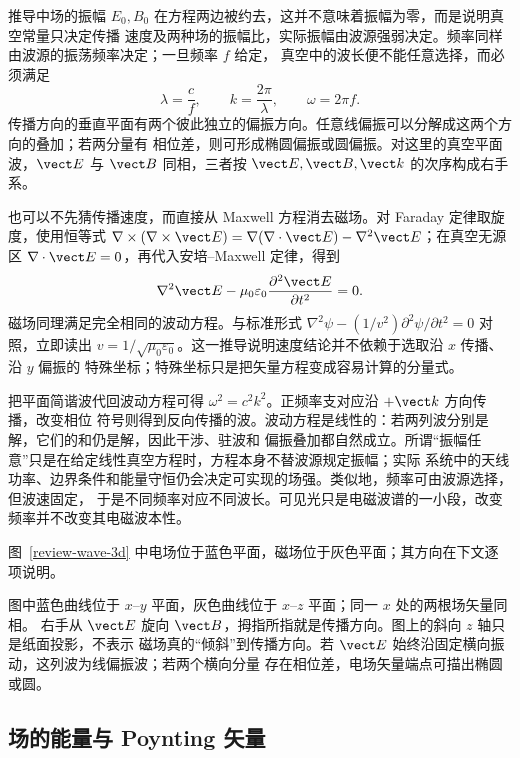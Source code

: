 推导中场的振幅 $E_0,B_0$ 在方程两边被约去，这并不意味着振幅为零，而是说明真空常量只决定传播
速度及两种场的振幅比，实际振幅由波源强弱决定。频率同样由波源的振荡频率决定；一旦频率 $f$ 给定，
真空中的波长便不能任意选择，而必须满足
\begin{equation}
  \lambda=\frac{c}{f},\qquad k=\frac{2\pi}{\lambda},\qquad \omega=2\pi f.
\end{equation}
传播方向的垂直平面有两个彼此独立的偏振方向。任意线偏振可以分解成这两个方向的叠加；若两分量有
相位差，则可形成椭圆偏振或圆偏振。对这里的真空平面波，$\vect E$ 与 $\vect B$ 同相，三者按
$\vect E,\vect B,\vect k$ 的次序构成右手系。

也可以不先猜传播速度，而直接从 Maxwell 方程消去磁场。对 Faraday 定律取旋度，使用恒等式
$\nabla\times(\nabla\times\vect E)=\nabla(\nabla\cdot\vect E)-\nabla^2\vect E$；在真空无源区
$\nabla\cdot\vect E=0$，再代入安培--Maxwell 定律，得到
\begin{equation}
  \nabla^2\vect E-\mu_0\varepsilon_0\frac{\partial^2\vect E}{\partial t^2}=0.
\end{equation}
磁场同理满足完全相同的波动方程。与标准形式
$\nabla^2\psi-(1/v^2)\partial^2\psi/\partial t^2=0$ 对照，立即读出
$v=1/\sqrt{\mu_0\varepsilon_0}$。这一推导说明速度结论并不依赖于选取沿 $x$ 传播、沿 $y$ 偏振的
特殊坐标；特殊坐标只是把矢量方程变成容易计算的分量式。

把平面简谐波代回波动方程可得 $\omega^2=c^2k^2$。正频率支对应沿 $+\vect k$ 方向传播，改变相位
符号则得到反向传播的波。波动方程是线性的：若两列波分别是解，它们的和仍是解，因此干涉、驻波和
偏振叠加都自然成立。所谓“振幅任意”只是在给定线性真空方程时，方程本身不替波源规定振幅；实际
系统中的天线功率、边界条件和能量守恒仍会决定可实现的场强。类似地，频率可由波源选择，但波速固定，
于是不同频率对应不同波长。可见光只是电磁波谱的一小段，改变频率并不改变其电磁波本性。

图~\ref{review-wave-3d} 中电场位于蓝色平面，磁场位于灰色平面；其方向在下文逐项说明。

\planeWaveThreeDDiagram

图中蓝色曲线位于 $x$--$y$ 平面，灰色曲线位于 $x$--$z$ 平面；同一 $x$ 处的两根场矢量同相。
右手从 $\vect E$ 旋向 $\vect B$，拇指所指就是传播方向。图上的斜向 $z$ 轴只是纸面投影，不表示
磁场真的“倾斜”到传播方向。若 $\vect E$ 始终沿固定横向振动，这列波为线偏振波；若两个横向分量
存在相位差，电场矢量端点可描出椭圆或圆。

\subsection{场的能量与 Poynting 矢量}

